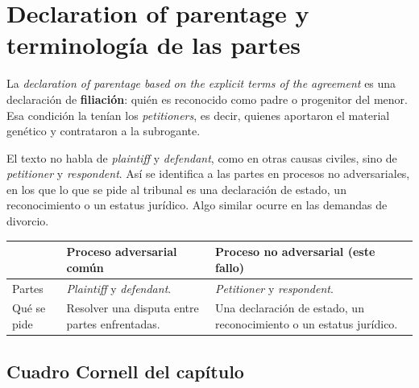 \documentclass[12pt,oneside]{book}
\begin{document}
\section{Declaration of parentage y terminología de las partes}

La \textit{declaration of parentage based on the explicit terms of the agreement} es una declaración de \textbf{filiación}: quién es reconocido como padre o progenitor del menor. Esa condición la tenían los \textit{petitioners}, es decir, quienes aportaron el material genético y contrataron a la subrogante.

El texto no habla de \textit{plaintiff} y \textit{defendant}, como en otras causas civiles, sino de \textit{petitioner} y \textit{respondent}. Así se identifica a las partes en procesos no adversariales, en los que lo que se pide al tribunal es una declaración de estado, un reconocimiento o un estatus jurídico. Algo similar ocurre en las demandas de divorcio.

\begin{table}[H]
\centering
\begin{tabularx}{\textwidth}{
    >{\raggedright\arraybackslash}p{}
    >{\raggedright\arraybackslash}X
    >{\raggedright\arraybackslash}X
}
\toprule
 & \textbf{Proceso adversarial común} & \textbf{Proceso no adversarial (este fallo)} \\
\midrule
Partes & \textit{Plaintiff} y \textit{defendant}. & \textit{Petitioner} y \textit{respondent}. \\
Qué se pide & Resolver una disputa entre partes enfrentadas. & Una declaración de estado, un reconocimiento o un estatus jurídico. \\
\bottomrule
\end{tabularx}
\end{table}

\subsection*{Cuadro Cornell del capítulo}
\end{document}
